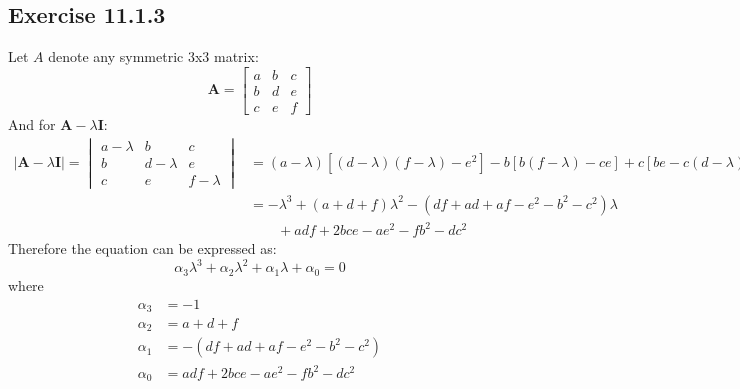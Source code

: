 \documentclass[11pt]{article}
\providecommand{\abs}[1]{\lvert#1\rvert}
\newcommand{\bA}{ \bm{A} }
\newcommand{\bI}{ \bm{I} }
\begin{document}
\subsection*{Exercise 11.1.3}
Let $A$ denote any symmetric 3x3 matrix:
\[
  \bA =
  \begin{bmatrix}
    a & b & c\\
    b & d & e\\
    c & e & f
  \end{bmatrix}
\]
And for $\bA - \lambda\bI $:
\begin{align*}
  \abs{\bA - \lambda\bI} =
  \begin{vmatrix}
   a-\lambda & b & c\\
    b & d-\lambda & e\\
    c & e & f-\lambda
  \end{vmatrix} &= (a-\lambda)[(d-\lambda)(f-\lambda) - e^2] - b[b(f-\lambda)- ce] + c[be - c(d-\lambda)] \\
             &= -\lambda^3 + (a+d+f)\lambda^2 - (df + ad + af- e^2- b^2-c^2)\lambda \\
                 &\qquad + adf + 2bce - ae^2 - fb^2 - dc^2
\end{align*}
Therefore the equation can be expressed as:
\[
  \alpha_3\lambda^3 + \alpha_2\lambda^2 + \alpha_1\lambda + \alpha_0 = 0
\]
where
\begin{align*}
  \alpha_3 &= {-1} \\
  \alpha_2 &= a + d + f \\
  \alpha_1 &= - (df + ad + af - e^2 - b^2 - c^2) \\
  \alpha_0 &= adf + 2bce - ae^2 - fb^2 -dc^2
\end{align*}
\end{document}
